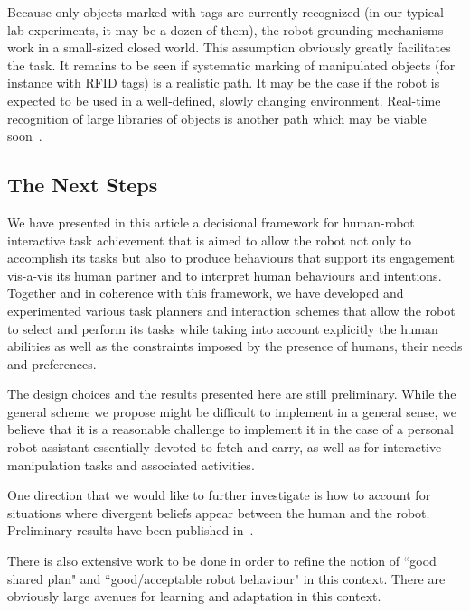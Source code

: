 \documentclass[preprint,3p,times]{elsarticle}
\begin{document}
Because only objects marked with tags are currently recognized (in our typical
lab experiments, it may be a dozen of them), the robot grounding mechanisms work
in a small-sized closed world. This assumption obviously greatly facilitates
the task. It remains to be seen if systematic marking of manipulated objects
(for instance with RFID tags) is a realistic path. It may be the case if the
robot is expected to be used in a well-defined, slowly changing environment.
Real-time recognition of large libraries of objects is another path which may
be viable soon~\cite{Dean2013Fast}.


\subsection{The Next Steps}

We have presented in this article a decisional framework for human-robot
interactive task achievement that is aimed to allow the robot not only to
accomplish its tasks but also to produce behaviours that support its engagement
vis-a-vis its human partner and to interpret human behaviours and intentions.
Together and in coherence with this framework, we have developed and
experimented various task planners and interaction schemes that allow the robot
to select and perform its tasks while taking into account explicitly the human
abilities as well as the constraints imposed by the presence of humans, their
needs and preferences. 

The design choices and the results presented here are still preliminary.
While the general scheme we propose might be difficult to implement in
a general sense, we believe that it is a reasonable challenge to
implement it in the case of a personal robot assistant essentially
devoted to fetch-and-carry, as well as for interactive manipulation
tasks and associated activities.

One direction that we would like to further investigate is how to account for
situations where divergent beliefs appear between the human and the robot.
Preliminary results have been published in~\cite{warnier2012when}.

There is also extensive work to be done in order to refine the notion of ``good
shared plan" and ``good/acceptable robot behaviour" in this context. There are
obviously large avenues for learning and adaptation in this context.
\end{document}
